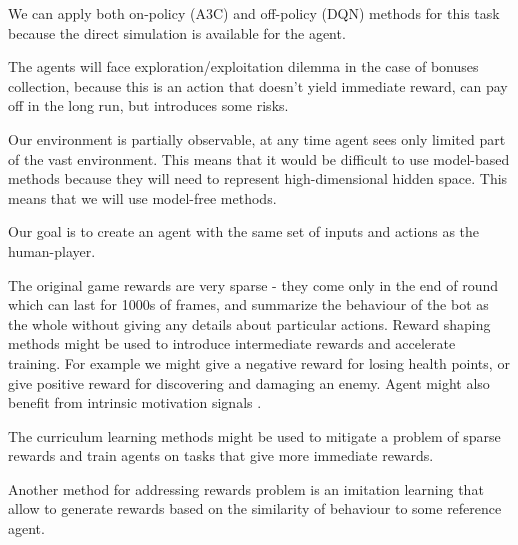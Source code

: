 
We can apply both on-policy (A3C) and off-policy (DQN) methods for this task because the direct simulation is available for the agent.

The agents will face exploration/exploitation dilemma in the case of bonuses collection, because this is an action that doesn't yield immediate reward, can pay off in the long run, but introduces some risks.

Our environment is partially observable, at any time agent sees only limited part of the vast environment. This means that it would be difficult to use model-based methods because they will need to represent high-dimensional hidden space. This means that we will use model-free methods.

Our goal is to create an agent with the same set of inputs and actions as the human-player.


The original game rewards are very sparse - they come only in the end of round which can last for 1000s of frames, and summarize the behaviour of the bot as the whole without giving any details about particular actions.
Reward shaping \cite{RewardShaping} methods might be used to introduce intermediate rewards and accelerate training. For example we might give a negative reward for losing health points, or give positive reward for discovering and damaging an enemy.
Agent might also benefit from intrinsic motivation signals \cite{IntrinsicMotivation}.


The curriculum learning \cite{ToBeDone} methods might be used to mitigate a problem of sparse rewards and train agents on tasks that give more immediate rewards.

Another method for addressing rewards problem is an imitation learning \cite{ToBeDone} that allow to generate rewards based on the similarity of behaviour to some reference agent.

